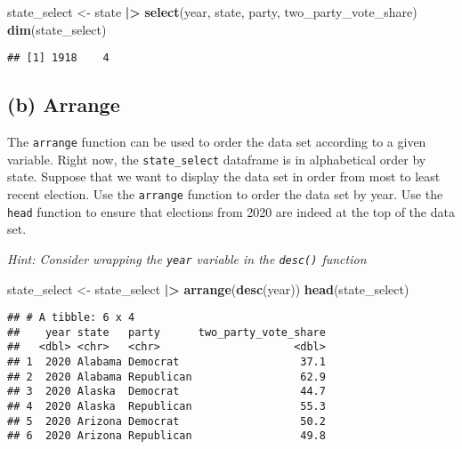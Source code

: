 \documentclass[
]{article}
\newenvironment{Shaded}{\begin{snugshade}}{\end{snugshade}}
\newcommand{\FunctionTok}[1]{\textcolor[rgb]{0.13,0.29,0.53}{\textbf{#1}}}
\newcommand{\NormalTok}[1]{#1}
\newcommand{\OtherTok}[1]{\textcolor[rgb]{0.56,0.35,0.01}{#1}}
\newcommand{\SpecialCharTok}[1]{\textcolor[rgb]{0.81,0.36,0.00}{\textbf{#1}}}
\begin{document}
\begin{Shaded}
\begin{Highlighting}[]
\NormalTok{state\_select }\OtherTok{\textless{}{-}}\NormalTok{ state }\SpecialCharTok{|\textgreater{}}
  \FunctionTok{select}\NormalTok{(year, state, party, two\_party\_vote\_share)}
\FunctionTok{dim}\NormalTok{(state\_select)}
\end{Highlighting}
\end{Shaded}

\begin{verbatim}
## [1] 1918    4
\end{verbatim}

\subsection{(b) Arrange}\label{b-arrange}

The \texttt{arrange} function can be used to order the data set
according to a given variable. Right now, the \texttt{state\_select}
dataframe is in alphabetical order by state. Suppose that we want to
display the data set in order from most to least recent election. Use
the \texttt{arrange} function to order the data set by year. Use the
\texttt{head} function to ensure that elections from 2020 are indeed at
the top of the data set.

\emph{Hint: Consider wrapping the \texttt{year} variable in the
\texttt{desc()} function}

\begin{Shaded}
\begin{Highlighting}[]
\NormalTok{state\_select }\OtherTok{\textless{}{-}}\NormalTok{ state\_select }\SpecialCharTok{|\textgreater{}}
  \FunctionTok{arrange}\NormalTok{(}\FunctionTok{desc}\NormalTok{(year))}
\FunctionTok{head}\NormalTok{(state\_select)}
\end{Highlighting}
\end{Shaded}

\begin{verbatim}
## # A tibble: 6 x 4
##    year state   party      two_party_vote_share
##   <dbl> <chr>   <chr>                     <dbl>
## 1  2020 Alabama Democrat                   37.1
## 2  2020 Alabama Republican                 62.9
## 3  2020 Alaska  Democrat                   44.7
## 4  2020 Alaska  Republican                 55.3
## 5  2020 Arizona Democrat                   50.2
## 6  2020 Arizona Republican                 49.8
\end{verbatim}
\end{document}
